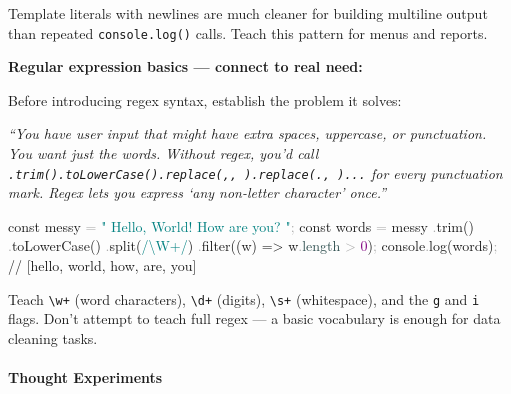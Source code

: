 \documentclass[
  justified,
  openright,
]{tufte-book}
\let\paragraph\paragraph
\newcommand{\AttributeTok}[1]{\textcolor{DarkSlateGray}{#1}}
\newcommand{\BuiltInTok}[1]{#1}
\newcommand{\CommentTok}[1]{\textcolor{MidGray}{#1}}
\newcommand{\DecValTok}[1]{\textcolor{Purple}{#1}}
\newcommand{\FunctionTok}[1]{\textcolor{BrandBlue}{#1}}
\newcommand{\KeywordTok}[1]{\textcolor{BrandBlue}{#1}}
\newcommand{\NormalTok}[1]{#1}
\newcommand{\OperatorTok}[1]{\textcolor{DarkGray}{#1}}
\newcommand{\SpecialCharTok}[1]{\textcolor{Teal}{#1}}
\newcommand{\SpecialStringTok}[1]{\textcolor{Teal}{#1}}
\newcommand{\StringTok}[1]{\textcolor{Teal}{#1}}
\newenvironment{Shaded}{%
  \begin{snugshade}
}{%
  \end{snugshade}
}
\let\paragraph\paragraph
\begin{document}
Template literals with newlines are much cleaner for building multiline
output than repeated \texttt{console.log()} calls. Teach this pattern
for menus and reports.

\textbf{Regular expression basics --- connect to real need:}

Before introducing regex syntax, establish the problem it solves:

\emph{``You have user input that might have extra spaces, uppercase, or
punctuation. You want just the words. Without regex, you'd call
\texttt{.trim().toLowerCase().replace(\textquotesingle{},\textquotesingle{},\ \textquotesingle{}\textquotesingle{}).replace(\textquotesingle{}.\textquotesingle{},\ \textquotesingle{}\textquotesingle{})...}
for every punctuation mark. Regex lets you express `any non-letter
character' once.''}

\begin{Shaded}
\begin{Highlighting}[]
\KeywordTok{const}\NormalTok{ messy }\OperatorTok{=} \StringTok{"  Hello, World!   How are you?  "}\OperatorTok{;}
\KeywordTok{const}\NormalTok{ words }\OperatorTok{=}\NormalTok{ messy}
  \OperatorTok{.}\FunctionTok{trim}\NormalTok{()}
  \OperatorTok{.}\FunctionTok{toLowerCase}\NormalTok{()}
  \OperatorTok{.}\FunctionTok{split}\NormalTok{(}\SpecialStringTok{/}\SpecialCharTok{\textbackslash{}W+}\SpecialStringTok{/}\NormalTok{)}
  \OperatorTok{.}\FunctionTok{filter}\NormalTok{((w) }\KeywordTok{=\textgreater{}}\NormalTok{ w}\OperatorTok{.}\AttributeTok{length} \OperatorTok{\textgreater{}} \DecValTok{0}\NormalTok{)}\OperatorTok{;}
\BuiltInTok{console}\OperatorTok{.}\FunctionTok{log}\NormalTok{(words)}\OperatorTok{;} \CommentTok{// [\textquotesingle{}hello\textquotesingle{}, \textquotesingle{}world\textquotesingle{}, \textquotesingle{}how\textquotesingle{}, \textquotesingle{}are\textquotesingle{}, \textquotesingle{}you\textquotesingle{}]}
\end{Highlighting}
\end{Shaded}

Teach \texttt{\textbackslash{}w+} (word characters),
\texttt{\textbackslash{}d+} (digits), \texttt{\textbackslash{}s+}
(whitespace), and the \texttt{g} and \texttt{i} flags. Don't attempt to
teach full regex --- a basic vocabulary is enough for data cleaning
tasks.

\paragraph{Thought Experiments}\label{thought-experiments-6}
\end{document}
